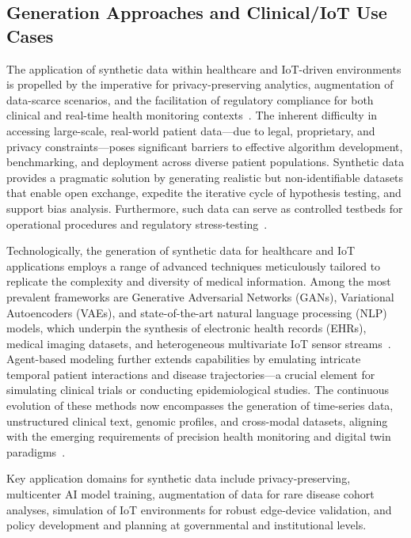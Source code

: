 \documentclass[sigconf]{acmart}
\begin{document}
\subsection{Generation Approaches and Clinical/IoT Use Cases}

The application of synthetic data within healthcare and IoT-driven environments is propelled by the imperative for privacy-preserving analytics, augmentation of data-scarce scenarios, and the facilitation of regulatory compliance for both clinical and real-time health monitoring contexts~\cite{ref91,ref106}. The inherent difficulty in accessing large-scale, real-world patient data—due to legal, proprietary, and privacy constraints—poses significant barriers to effective algorithm development, benchmarking, and deployment across diverse patient populations. Synthetic data provides a pragmatic solution by generating realistic but non-identifiable datasets that enable open exchange, expedite the iterative cycle of hypothesis testing, and support bias analysis. Furthermore, such data can serve as controlled testbeds for operational procedures and regulatory stress-testing~\cite{ref91,ref106}.

Technologically, the generation of synthetic data for healthcare and IoT applications employs a range of advanced techniques meticulously tailored to replicate the complexity and diversity of medical information. Among the most prevalent frameworks are Generative Adversarial Networks (GANs), Variational Autoencoders (VAEs), and state-of-the-art natural language processing (NLP) models, which underpin the synthesis of electronic health records (EHRs), medical imaging datasets, and heterogeneous multivariate IoT sensor streams~\cite{ref91}. Agent-based modeling further extends capabilities by emulating intricate temporal patient interactions and disease trajectories—a crucial element for simulating clinical trials or conducting epidemiological studies. The continuous evolution of these methods now encompasses the generation of time-series data, unstructured clinical text, genomic profiles, and cross-modal datasets, aligning with the emerging requirements of precision health monitoring and digital twin paradigms~\cite{ref91,ref106}.

Key application domains for synthetic data include privacy-preserving, multicenter AI model training, augmentation of data for rare disease cohort analyses, simulation of IoT environments for robust edge-device validation, and policy development and planning at governmental and institutional levels.
\end{document}
